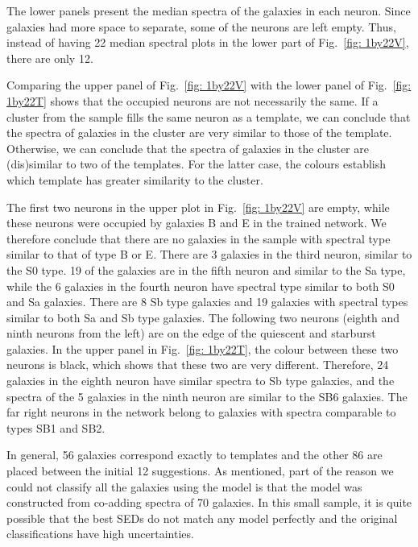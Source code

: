             The lower panels present the median spectra of the galaxies in each neuron.
            Since galaxies had more space to separate, some of the neurons are left empty.
            Thus, instead of having 22 median spectral plots in the lower part of Fig.~\ref{fig: 1by22V}, there are only 12.
            
            Comparing the upper panel of Fig.~\ref{fig: 1by22V} with the lower panel of Fig.~\ref{fig: 1by22T} shows that the occupied neurons are not necessarily the same.
            If a cluster from the  sample fills the same neuron as a  template, we can conclude that the spectra of galaxies in the cluster are very similar to those of the template.
            Otherwise, we can conclude that the spectra of galaxies in the cluster are (dis)similar to two of the  templates.
            For the latter case, the colours establish which template has greater similarity to the  cluster.
            
            The first two neurons in the upper plot in Fig.~\ref{fig: 1by22V} are empty, while these neurons were occupied by galaxies B and E in the trained network.
            We therefore conclude that there are no galaxies in the  sample with spectral type similar to that of type B or E.
            There are 3 galaxies in the third neuron, similar to the S0 type. 
            19 of the galaxies are in the fifth neuron and similar to the Sa type, while the 6 galaxies in the fourth neuron have spectral type similar to both S0 and Sa galaxies.
            There are 8 Sb type galaxies and 19 galaxies with spectral types similar to both Sa and Sb type galaxies.
            The following two neurons (eighth and ninth neurons from the left) are on the edge of the quiescent and starburst galaxies.
            In the upper panel in Fig.~\ref{fig: 1by22T}, the colour between these two neurons is black, which shows that these two are very different.
            Therefore, 24 galaxies in the eighth neuron have similar spectra to Sb type galaxies, and the spectra of the 5 galaxies in the ninth neuron are similar to the SB6 galaxies.
            The far right neurons in the network belong to galaxies with spectra comparable to types SB1 and SB2.
            
            In general, 56 galaxies correspond exactly to  templates and the other 86 are placed between the initial 12 suggestions.
            As  mentioned, part of the reason we could not classify all the galaxies using the  model is that the model was constructed from co-adding spectra of 70 galaxies.
            In this small sample, it is quite possible that the best SEDs do not match any model perfectly and the original classifications have high uncertainties.
            
